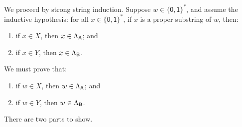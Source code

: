 We proceed by strong string induction.  Suppose
$w\in\{\mathsf{0,1}\}^*$, and assume the inductive hypothesis:
for all $x\in\{\mathsf{0,1}\}^*$, if $x$ is a proper substring of
$w$, then:
\begin{enumerate}[\quad(A)]
\item if $x\in X$, then $x\in\Lambda_{\mathsf{A}}$; and

\item if $x\in Y$, then $x\in\Lambda_{\mathsf{B}}$.
\end{enumerate}
We must prove that:
\begin{enumerate}[\quad(A)]
\item if $w\in X$, then $w\in\Lambda_{\mathsf{A}}$; and

\item if $w\in Y$, then $w\in\Lambda_{\mathsf{B}}$.
\end{enumerate}
There are two parts to show.
